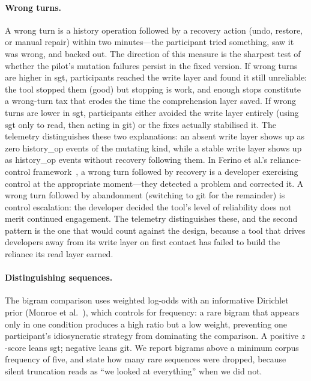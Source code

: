 \paragraph{Wrong turns.}
 A wrong turn is a history
operation followed by a recovery action (undo, restore, or manual repair) within
two minutes---the participant tried something, saw it was wrong, and backed out.
The direction of this measure is the sharpest test of whether the pilot's
mutation failures persist in the fixed version. If wrong turns are higher in
sgt, participants reached the write layer and found it still unreliable: the
tool stopped them (good) but stopping is work, and enough stops constitute a
wrong-turn tax that erodes the time the comprehension layer saved. If wrong
turns are lower in sgt, participants either avoided the write layer entirely
(using sgt only to read, then acting in git) or the fixes actually stabilised
it. The telemetry distinguishes these two explanations: an absent write layer
shows up as zero history\_op events of the mutating kind, while a stable write
layer shows up as history\_op events without recovery following them.
In Ferino et al.'s reliance-control framework~\cite{ferino2026}, a wrong turn
followed by recovery is a developer exercising control at the appropriate
moment---they detected a problem and corrected it. A wrong turn followed by
abandonment (switching to git for the remainder) is control escalation: the
developer decided the tool's level of reliability does not merit continued
engagement. The telemetry distinguishes these, and the second pattern is the
one that would count against the design, because a tool that drives developers
away from its write layer on first contact has failed to build the reliance its
read layer earned.

\paragraph{Distinguishing sequences.}

The bigram comparison uses weighted log-odds with an informative Dirichlet prior
(Monroe et al.~\cite{monroe2008}), which controls for frequency: a rare bigram
that appears only in one condition produces a high ratio but a low weight,
preventing one participant's idiosyncratic strategy from dominating the
comparison. A positive $z$-score leans sgt; negative leans git. We report
bigrams above a minimum corpus frequency of five, and state how many rare
sequences were dropped, because silent truncation reads as ``we looked at
everything'' when we did not.

